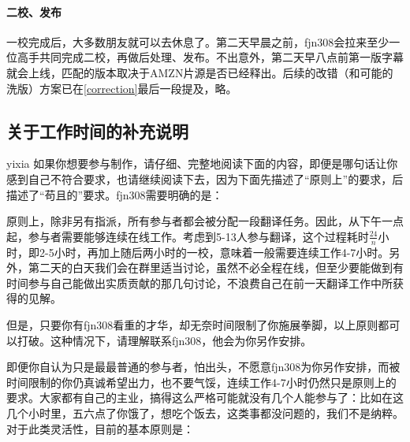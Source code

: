 \documentclass{ctexart}
\begin{document}
\paragraph{二校、发布}

一校完成后，大多数朋友就可以去休息了。第二天早晨之前，fjn308会拉来至少一位高手共同完成二校，再做后处理、发布。不出意外，第二天早八点前第一版字幕就会上线，匹配的版本取决于AMZN片源是否已经释出。后续的改错（和可能的洗版）方案已在\ref{correction}最后一段提及，略。

\subsection{关于工作时间的补充说明}
yixia
如果你想要参与制作，请仔细、完整地阅读下面的内容，即便是哪句话让你感到自己不符合要求，也请继续阅读下去，因为下面先描述了“原则上”的要求，后描述了“苟且的”要求。fjn308需要明确的是：

原则上，除非另有指派，所有参与者都会被分配一段翻译任务。因此，从下午一点起，参与者需要能够连续在线工作。考虑到5-13人参与翻译，这个过程耗时$\frac{24}{n}$小时，即2-5小时，再加上随后两小时的一校，意味着一般需要连续工作4-7小时。另外，第二天的白天我们会在群里适当讨论，虽然不必全程在线，但至少要能做到有时间参与自己能做出实质贡献的那几句讨论，不浪费自己在前一天翻译工作中所获得的见解。

但是，只要你有fjn308看重的才华，却无奈时间限制了你施展拳脚，以上原则都可以打破。这种情况下，请理解联系fjn308，他会为你另作安排。

即便你自认为只是最最普通的参与者，怕出头，不愿意fjn308为你另作安排，而被时间限制的你仍真诚希望出力，也不要气馁，连续工作4-7小时仍然只是原则上的要求。大家都有自己的主业，搞得这么严格可能就没有几个人能参与了：比如在这几个小时里，五六点了你饿了，想吃个饭去，这类事都没问题的，我们不是纳粹。对于此类灵活性，目前的基本原则是：
\end{document}
